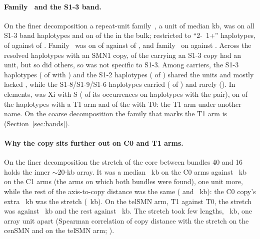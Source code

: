 \paragraph{Family~ and the S1-3 band.} On the finer decomposition a repeat-unit family~, a unit of median \sGkb{} kb,
was on all \sBandG{} S1-3 band haplotypes and on \sCenG{} of the \sCen{} in the bulk; restricted to ``2-~1+''
haplotypes, \sBandTwoOneG{} of \sBandTwoOneN{} against \sCenTwoOneG{} of \sCenTwoOneN{}.
Family~ was on \sBandC{} of \sBand{} against \sCenC{} of \sCen, and family~ on \sBandD{} against \sCenD. Across the
\sHaps{} resolved haplotypes with an SMN1 copy, \sGandT{} of the \sTall{} carrying an S1-3 copy had an  unit, but so
did \sGnotT{} others, so  was not specific to S1-3. Among  carriers, the S1-3 haplotypes (\sGThreeC{} of \sGThreen{}
with ) and the S1-2 haplotypes (\sGTwoC{} of \sGTwon{}) shared the  units and mostly lacked , while the
S1-8/S1-9/S1-6 haplotypes carried  (\sGEightD{} of \sGEightn) and rarely  (\sGEightC). In elements,  was Xi with S
(\ffeGcombo{} of its \ffeGocc{} occurrences on haplotypes with the pair), on \fafGTOne{} of the \fafTOneAll{}
haplotypes with a T1 arm and \fafGTZero{} of the \fafTZeroAll{} with T0: the T1 arm under another name. On the coarse decomposition the family that
marks the T1 arm is \RU{\afSigFam} (Section~\ref{sec:bands}).

\paragraph{Why the copy sits further out on C0 and T1 arms.} On the finer decomposition the stretch of the core between
bundles 40 and 16 holds the inner $\sim$20-kb array. It was a median \fcpArrCZero~kb on the \fcpNCZero{} C0 arms
against \fcpArrCOne~kb on the \fcpNCOne{} C1 arms (the arms on which both bundles were found), one unit more, while the rest of the axis-to-copy distance was the
same (\fcpRestCZero{} and \fcpRestCOne~kb): the C0 copy's extra \fcpDiffCopycen~kb was the stretch
(\fcpDiffArrcen~kb). On the telSMN arm, T1 against T0, the stretch was \fcpArrTOne{} against \fcpArrTZero~kb and the
rest \fcpRestTOne{} against \fcpRestTZero~kb. The stretch took few lengths, \fcpModes~kb, one array unit apart
(Spearman correlation of copy distance with the stretch \fcpRhocen{} on the cenSMN and \fcpRhotel{} on the telSMN
arm; ).

